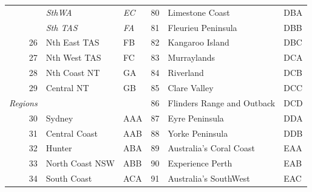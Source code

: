 \documentclass[a4paper,11pt]{article}
\theoremstyle{definition}
\begin{document}
\begin{table}[H]
\begin{tabular}{r l l|r l l}
		                                     & \textit{SthWA}          & \textit{EC}    & 80                                              & Limestone Coast                 & DBA            \\
		                                     & \textit{Sth TAS}        & \textit{FA}    & 81                                              & Fleurieu Peninsula              & DBB            \\
		26                                   & Nth East TAS            & FB             & 82                                              & Kangaroo Island                 & DBC            \\
		27                                   & Nth West TAS            & FC             & 83                                              & Murraylands                     & DCA            \\
		28                                   & Nth Coast NT            & GA             & 84                                              & Riverland                       & DCB            \\
		29                                   & Central NT              & GB             & 85                                              & Clare Valley                    & DCC            \\
		\cline{1-3}
		\multicolumn{1}{l}{\textit{Regions}} &                         &                & 86                                              & Flinders Range and Outback      & DCD            \\
		30                                   & Sydney                  & AAA            & 87                                              & Eyre Peninsula                  & DDA            \\
		31                                   & Central Coast           & AAB            & 88                                              & Yorke Peninsula                 & DDB            \\
		32                                   & Hunter                  & ABA            & 89                                              & Australia’s Coral Coast         & EAA            \\
		33                                   & North Coast NSW         & ABB            & 90                                              & Experience Perth                & EAB            \\
		34                                   & South Coast             & ACA            & 91                                              & Australia’s SouthWest           & EAC            \\

\end{tabular}
\end{table}
\end{document}
